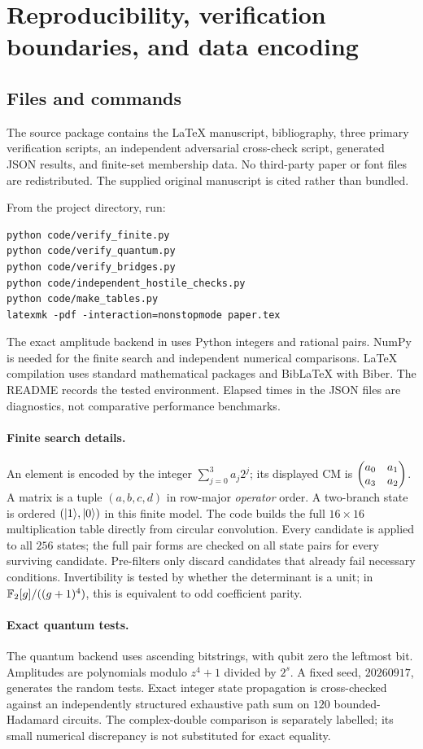 \section{Reproducibility, verification boundaries, and data encoding}\label{app:repro}
\subsection{Files and commands}
The source package contains the LaTeX manuscript, bibliography, three primary verification scripts, an independent adversarial cross-check script, generated JSON results, and finite-set membership data. No third-party paper or font files are redistributed. The supplied original manuscript is cited rather than bundled.

From the project directory, run:
\begin{verbatim}
python code/verify_finite.py
python code/verify_quantum.py
python code/verify_bridges.py
python code/independent_hostile_checks.py
python code/make_tables.py
latexmk -pdf -interaction=nonstopmode paper.tex
\end{verbatim}
The exact amplitude backend in  uses Python integers and rational pairs. NumPy is needed for the finite search and independent numerical comparisons. LaTeX compilation uses standard mathematical packages and BibLaTeX with Biber. The README records the tested environment. Elapsed times in the JSON files are diagnostics, not comparative performance benchmarks.

\paragraph{Finite search details.}
An element is encoded by the integer $\sum_{j=0}^3a_j2^j$; its displayed CM is $\begin{pmatrix}a_0&a_1\\a_3&a_2\end{pmatrix}$. A matrix is a tuple $(a,b,c,d)$ in row-major \emph{operator} order. A two-branch state is ordered $(\lvert 1\rangle,\lvert 0\rangle)$ in this finite model. The code builds the full $16\times16$ multiplication table directly from circular convolution. Every candidate is applied to all $256$ states; the full pair forms are checked on all state pairs for every surviving candidate. Pre-filters only discard candidates that already fail necessary conditions. Invertibility is tested by whether the determinant is a unit; in $\mathbb F_2[g]/((g+1)^4)$, this is equivalent to odd coefficient parity.

\paragraph{Exact quantum tests.}
The quantum backend uses ascending bitstrings, with qubit zero the leftmost bit. Amplitudes are polynomials modulo $z^4+1$ divided by $2^s$. A fixed seed, $20260917$, generates the random tests. Exact integer state propagation is cross-checked against an independently structured exhaustive path sum on $120$ bounded-Hadamard circuits. The complex-double comparison is separately labelled; its small numerical discrepancy is not substituted for exact equality.


